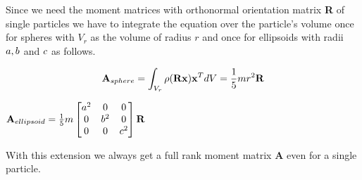 \documentclass[
	11pt, 
	DIV10,
	a4paper, 
	oneside, 
	headings=normal, 
	captions=tableheading,
	final, 
	numbers=noenddot
]{scrartcl}
\begin{document}
	\noindent Since we need the moment matrices with orthonormal orientation matrix \textbf{R} of single particles we have to integrate the equation over the particle's volume once for spheres with $V_r$ as the volume of radius $r$ and once for ellipsoids with radii $\mathnormal{a, b}$ and $\mathnormal{c}$ as follows.
	\begin{center}
		\begin{equation}\label{Asphere}
			\mathnormal{\mathbf{A}_{sphere}}= \int_{V_r}\rho(\mathbf{Rx})\mathbf{x}^T dV = \frac{1}{5}mr^2\mathbf{R}
		\end{equation}
	\end{center}
	\begin{center}
		$\mathnormal{\mathbf{A}_{ellipsoid}}= \frac{1}{5}m
		\begin{bmatrix}
			a^2& 0& 0 \\
			0& b^2& 0 \\
			0& 0& c^2
		\end{bmatrix}\mathbf{R}$
	\end{center} 
	\noindent With this extension we always get a full rank moment matrix \textbf{A} even for a single particle. \cite{2}
\end{document}
